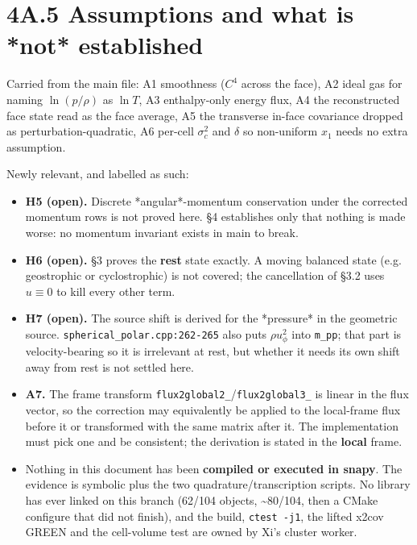 \documentclass[11pt,a4paper]{article}
\begin{document}
\hrulefill

\section*{4A.5 Assumptions and what is *not* established}

Carried from the main file: A1 smoothness ($C^4$ across the face), A2 ideal gas
for naming $\ln(p/\rho)$ as $\ln T$, A3 enthalpy-only energy flux, A4 the
reconstructed face state read as the face average, A5 the transverse in-face
covariance dropped as perturbation-quadratic, A6 per-cell $\sigma_c^2$ and
$\delta$ so non-uniform $x_1$ needs no extra assumption.

Newly relevant, and labelled as such:

\begin{itemize}
\item \textbf{H5 (open).} Discrete *angular*-momentum conservation under the corrected
  momentum rows is not proved here. §4 establishes only that nothing is made
  worse: no momentum invariant exists in main to break.
\item \textbf{H6 (open).} §3 proves the \textbf{rest} state exactly. A moving balanced state
  (e.g. geostrophic or cyclostrophic) is not covered; the cancellation of §3.2
  uses $u\equiv0$ to kill every other term.
\item \textbf{H7 (open).} The source shift is derived for the *pressure* in the geometric
  source. \texttt{spherical\_polar.cpp:262-265} also puts $\rho u_\phi^2$ into \texttt{m\_pp};
  that part is velocity-bearing so it is irrelevant at rest, but whether it needs
  its own shift away from rest is not settled here.
\item \textbf{A7.} The frame transform \texttt{flux2global2\_}/\texttt{flux2global3\_} is linear in the
  flux vector, so the correction may equivalently be applied to the local-frame
  flux before it or transformed with the same matrix after it. The implementation
  must pick one and be consistent; the derivation is stated in the \textbf{local}
  frame.
\item Nothing in this document has been \textbf{compiled or executed in snapy}. The
  evidence is symbolic plus the two quadrature/transcription scripts. No library
  has ever linked on this branch (62/104 objects, \textasciitilde{}80/104, then a CMake configure
  that did not finish), and the build, \texttt{ctest -j1}, the lifted x2cov GREEN and the
  cell-volume test are owned by Xi's cluster worker.
\end{itemize}
\end{document}
